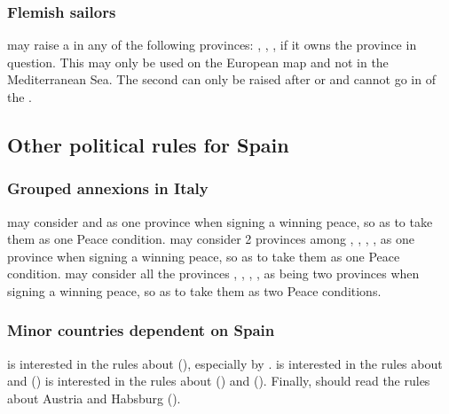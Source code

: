 \subsubsection{Flemish sailors}
\aparag \SPA may raise a \corsaire in any of the following provinces:
, , ,
 if it owns the province in question.
\bparag This \corsaire may only be used on the European map and not in
the Mediterranean Sea.
\aparag The second \corsaire can only be raised after
 or  and cannot go in \STZ of the
.



\subsection{Other political rules for Spain}


\subsubsection{Grouped annexions in Italy}
\aparag \SPA may consider  and  as
one province when signing a winning peace, so as to take them as one
Peace condition.
\aparag \SPA may consider 2 provinces among ,
, , ,
 as one province when signing a winning peace, so as
to take them as one Peace condition.
\aparag \SPA may consider all the provinces ,
, , ,
 as being two provinces when signing a winning peace,
so as to take them as two Peace conditions.


\subsubsection{Minor countries dependent on Spain}
\aparag[Knights] \SPA is interested in the rules about 
(), especially by .
 \SPA is interested in the rules about
 and  ()
\aparag[Burgundy] \SPA is interested in the rules about 
() and  ().
\aparag[Austria] Finally, \SPA should read the rules about Austria and
Habsburg ().


